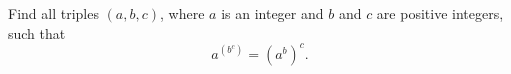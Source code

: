 Find all triples $(a,b,c)$, where $a$ is an integer and $b$ and $c$ are positive integers, such that
\[a^{\left(b^c\right)}=\left(a^b\right)^c.\]
